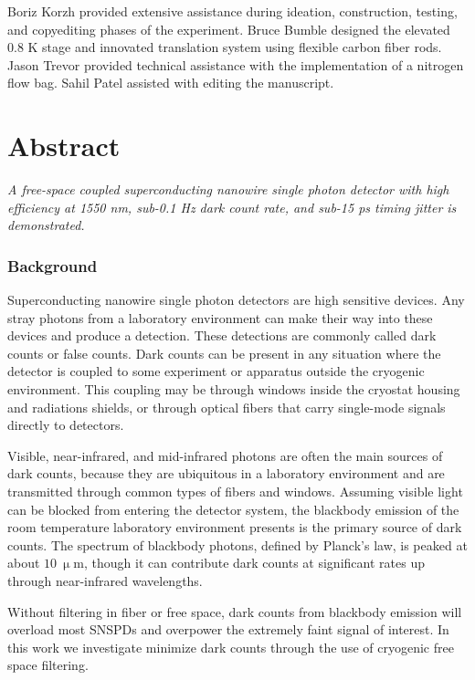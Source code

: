 \documentclass[11pt]{caltech_thesis} %
\begin{document}
Boriz Korzh provided extensive assistance during ideation, construction, testing, and copyediting phases of the experiment. Bruce Bumble designed the elevated 0.8 K stage and innovated translation system using flexible carbon fiber rods. Jason Trevor provided technical assistance with the implementation of a nitrogen flow bag. Sahil Patel assisted with editing the manuscript.

\hypertarget{abstract}{%
\section{Abstract}\label{abstract}}

\emph{A free-space coupled superconducting nanowire single photon detector with high efficiency at 1550 nm, sub-0.1 Hz dark count rate, and sub-15 ps timing jitter is demonstrated.}

\hypertarget{background}{%
\subsubsection{Background}\label{background}}

Superconducting nanowire single photon detectors are high sensitive devices. Any stray photons from a laboratory environment can make their way into these devices and produce a detection. These detections are commonly called dark counts or false counts. Dark counts can be present in any situation where the detector is coupled to some experiment or apparatus outside the cryogenic environment. This coupling may be through windows inside the cryostat housing and radiations shields, or through optical fibers that carry single-mode signals directly to detectors.

Visible, near-infrared, and mid-infrared photons are often the main sources of dark counts, because they are ubiquitous in a laboratory environment and are transmitted through common types of fibers and windows. Assuming visible light can be blocked from entering the detector system, the blackbody emission of the room temperature laboratory environment presents is the primary source of dark counts. The spectrum of blackbody photons, defined by Planck's law, is peaked at about $10~\mathrm{\upmu m}$, though it can contribute dark counts at significant rates up through near-infrared wavelengths.

Without filtering in fiber or free space, dark counts from blackbody emission will overload most SNSPDs and overpower the extremely faint signal of interest. In this work we investigate minimize dark counts through the use of cryogenic free space filtering.
\end{document}
